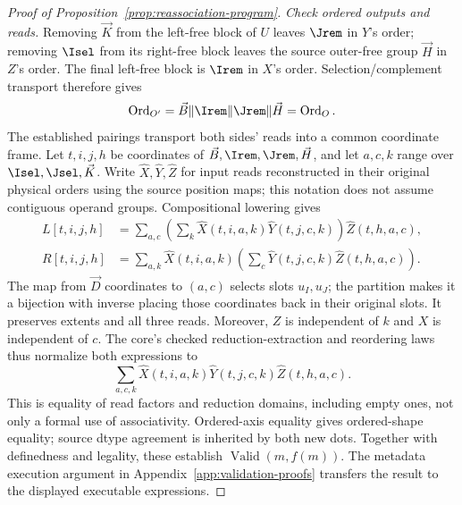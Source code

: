 \begin{proof}[Proof of Proposition~\ref{prop:reassociation-program}]
\emph{Check ordered outputs and reads.}
Removing $\vec K$ from the left-free block of $U$ leaves $\Jrem$ in $Y$'s
order; removing $\Isel$ from its right-free block leaves the source
outer-free group $\vec H$ in $Z$'s order. The final left-free block is $\Irem$
in $X$'s order. Selection/complement transport therefore gives
\begin{equation}
 \operatorname{Ord}_{O'}=\vec B\Vert\Irem\Vert\Jrem\Vert \vec H=\operatorname{Ord}_O.
 \label{eq:reassociation-output-proof}
\end{equation}
The established pairings transport both sides' reads into a common
coordinate frame. Let $t,i,j,h$ be coordinates of
$\vec B,\Irem,\Jrem,\vec H$, and let $a,c,k$ range over
$\Isel,\Jsel,\vec K$. Write $\widehat X,\widehat Y,\widehat Z$ for input
reads reconstructed in their original physical orders using the source
position maps; this notation does not assume contiguous operand groups.
Compositional lowering gives
\begin{equation}
\begin{aligned}
 L[t,i,j,h]
 &=\sum_{a,c}\left(\sum_k
       \widehat X(t,i,a,k)\widehat Y(t,j,c,k)\right)
       \widehat Z(t,h,a,c),\\
 R[t,i,j,h]
 &=\sum_{a,k}\widehat X(t,i,a,k)
       \left(\sum_c\widehat Y(t,j,c,k)\widehat Z(t,h,a,c)\right).
\end{aligned}
\label{eq:reassociation-lowered}
\end{equation}
The map from $\vec D$ coordinates to $(a,c)$ selects slots $u_I,u_J$;
the partition makes it a bijection with inverse placing those coordinates
back in their original slots. It preserves extents and all three reads.
Moreover, $Z$ is independent of $k$ and $X$ is independent of $c$.
The core's checked reduction-extraction and reordering laws thus normalize
both expressions to
\begin{equation}
 \sum_{a,c,k}\widehat X(t,i,a,k)
                 \widehat Y(t,j,c,k)\widehat Z(t,h,a,c).
 \label{eq:reassociation-common-normal-form}
\end{equation}
This is equality of read factors and reduction domains, including empty
ones, not only a formal use of associativity. Ordered-axis equality gives
ordered-shape equality; source dtype agreement is inherited by both new
dots. Together with definedness and legality, these establish
$\operatorname{Valid}(m,f(m))$. The metadata execution argument in
Appendix~\ref{app:validation-proofs} transfers the result to the
displayed executable expressions.
\end{proof}
